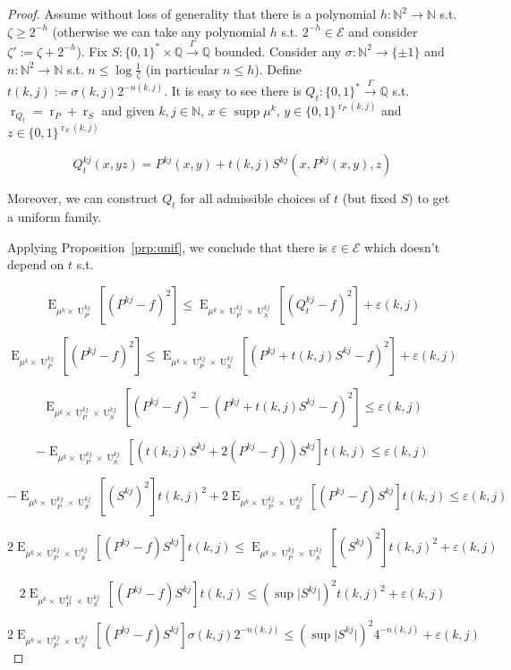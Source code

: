 \documentclass{article}
\numberwithin{equation}{section}
\theoremstyle{definition}
\theoremstyle{plain}
\newcommand{\Bool}{\{0,1\}}
\newcommand{\Words}{{\Bool^*}}
\newcommand{\WordsLen}[1]{{\Bool^{#1}}}
\DeclareMathOperator{\Supp}{supp}
\DeclareMathOperator{\E}{E}
\DeclareMathOperator{\R}{r}
\DeclareMathOperator{\U}{U}
\newcommand{\Nats}{\mathbb{N}}
\newcommand{\Rats}{\mathbb{Q}}
\newcommand{\Abs}[1]{\lvert #1 \rvert}
\newcommand{\Fall}{\mathcal{E}}
\newcommand{\Scheme}{\xrightarrow{\Gamma}}
\begin{document}
\begin{proof}

Assume without loss of generality that there is a polynomial ${h: \Nats^2 \rightarrow \Nats}$ s.t. $\zeta \geq 2^{-h}$ (otherwise we can take any polynomial $h$ s.t. $2^{-h} \in \Fall$ and consider $\zeta':=\zeta+2^{-h}$). Fix $S: \Words \times \Rats \Scheme \Rats$ bounded. Consider any ${\sigma: \Nats^2 \rightarrow \{ \pm 1 \}}$ and $n: \Nats^2 \rightarrow \Nats$ s.t. $n \leq \log \frac{1}{\zeta}$ (in particular $n \leq h$). Define ${t(k,j) := \sigma(k,j) 2^{-n(k,j)}}$. It is easy to see there is ${Q_t: \Words \Scheme \Rats}$ s.t. ${\R_{Q_t}=\R_P+\R_S}$ and given $k,j \in \Nats$, $x \in \Supp \mu^k$, ${y \in \WordsLen{\R_P(k,j)}}$ and ${z \in \WordsLen{ \R_S(k,j)}}$

$$Q_t^{kj}(x,yz) = P^{kj}(x,y) + t(k,j) S^{kj}(x,P^{kj}(x,y),z)$$

Moreover, we can construct $Q_t$ for all admissible choices of $t$ (but fixed $S$) to get a uniform family.

Applying Proposition~\ref{prp:unif}, we conclude that there is $\varepsilon \in \Fall$ which doesn't depend on $t$ s.t.

$$\E_{\mu^k \times \U_P^{kj}}[(P^{kj} - f)^2] \leq \E_{\mu^k \times \U_P^{kj} \times \U_S^{kj}}[(Q_t^{kj} - f)^2] + \varepsilon(k,j)$$

$$\E_{\mu^k \times \U_P^{kj}}[(P^{kj} - f)^2] \leq \E_{\mu^k \times \U_P^{kj} \times \U_S^{kj}}[(P^{kj} + t(k,j)S^{kj}  - f)^2] + \varepsilon(k,j)$$

$$\E_{\mu^k \times \U_P^{kj} \times \U_S^{kj}}[(P^{kj} - f)^2 - (P^{kj} + t(k,j)S^{kj} - f)^2] \leq \varepsilon(k,j)$$

$$-\E_{\mu^k \times \U_P^{kj} \times \U_S^{kj}}[(t(k,j)S^{kj} + 2 (P^{kj} - f)) S^{kj}] t(k,j) \leq \varepsilon(k,j)$$

$$-\E_{\mu^k \times \U_P^{kj} \times \U_S^{kj}}[(S^{kj})^2] t(k,j)^2 + 2 \E_{\mu^k \times \U_P^{kj} \times \U_S^{kj}}[(P^{kj} - f) S^{kj}] t(k,j) \leq \varepsilon(k,j)$$

$$2 \E_{\mu^k \times \U_P^{kj} \times \U_S^{kj}}[(P^{kj} - f) S^{kj}] t(k,j) \leq \E_{\mu^k \times \U_P^{kj} \times \U_S^{kj}}[(S^{kj})^2] t(k,j)^2 + \varepsilon(k,j)$$

$$2 \E_{\mu^k \times \U_P^{kj} \times \U_S^{kj}}[(P^{kj} - f) S^{kj}] t(k,j) \leq (\sup \Abs{S^{kj}})^2 t(k,j)^2 + \varepsilon(k,j)$$

$$2 \E_{\mu^k \times \U_P^{kj} \times \U_S^{kj}}[(P^{kj} - f) S^{kj}] \sigma(k,j) 2^{-n(k,j)} \leq (\sup \Abs{S^{kj}})^2 4^{-n(k,j)} + \varepsilon(k,j)$$


\end{proof}
\end{document}
